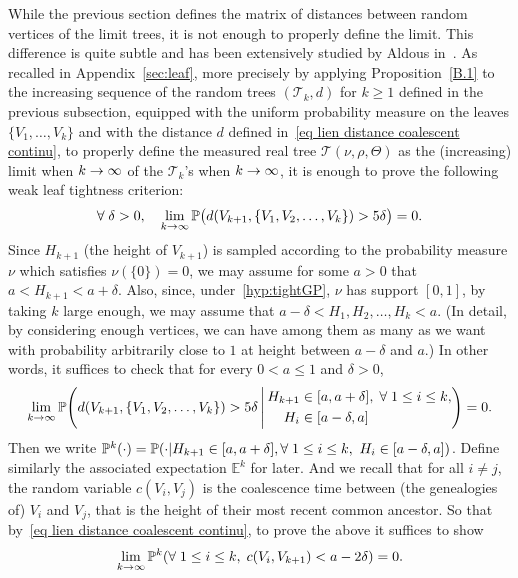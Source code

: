 \documentclass[10pt]{amsart}
\theoremstyle{definition}\newtheorem{defi}[theo]{Definition}\newtheorem{rema}[theo]{Remark}\newtheorem{exam}[theo]{Example}\newtheorem{exem}[theo]{Example}\newtheorem{nota}[theo]{Notation}
\newcommand{\probak}[1]{\mathbb{P}^k\left(#1\right)}
\renewcommand{\P}{{\mathbb{P}}}
\newcommand{\E}{\mathbb{E}}
\newcommand{\1}{\mathbbm{1}}
\newcommand{\T}{\mathcal{T}}
\let\originalleft\left
\let\originalright\right
\renewcommand{\left}{\mathopen{}\mathclose\bgroup\originalleft}
\renewcommand{\right}{\aftergroup\egroup\originalright}
\renewcommand*{\to}{\mathchoice{\longrightarrow}{\rightarrow}{\rightarrow}{\rightarrow}}
\let\oldforall\forall
\renewcommand*{\forall}{\mathrel{\oldforall}}
\begin{document}
While the previous section defines the matrix of distances between random vertices of the limit trees, it is not enough to properly define the limit. This difference is quite subtle and has been extensively studied by Aldous in~\cite{Ald93}. As recalled in Appendix~\ref{sec:leaf}, {more precisely by applying Proposition~\ref{B.1} to the increasing sequence of the random trees $(\T_k,d)$ for $k\ge 1$ defined in the previous subsection, equipped with the uniform probability measure on the leaves $\{V_1, \dots, V_k\}$ and with the distance $d$ defined in~\eqref{eq lien distance coalescent continu},} to properly define the {measured real tree $\T(\nu, \rho, \Theta)$ as the (increasing) limit when $k\to \infty$ of the $\T_k$'s when $k\to \infty$,} it is enough to prove the following weak leaf tightness criterion:
\[
\forall \delta>0, \quad \lim_{k\to \infty} \mathbb{P} \bigl(d(V_{k+1},\{V_1,V_2,\dots, V_k\})>{5}\delta\bigr)=0.
\]
Since $H_{k+1}$ (the height of $V_{k+1}$) is sampled according to the probability measure $\nu$ which satisfies $\nu(\{0\})=0$, we may assume for some $a>0$ that $a<H_{k+1}<a+\delta$. Also, since, under~\ref{hyp:tightGP}, $\nu$ has support $[0,1]${,} by taking $k$ large enough, we may assume that $a-\delta<H_1,H_2,\dots, H_k<a$. ({In} detail, by considering enough vertices, we can have among them as many as we want {with probability arbitrarily close to $1$} at height between $a-\delta$ and $a$.) In other words, it suffices to check that for every $0<a\leq 1$ and $\delta>0$,
\begin{align*}
\lim_{k\to \infty} \mathbb{P}\left(
d(V_{k+1},\{V_1,V_2,\dots, V_k\})>{5}\delta \,\middle|\,
\begin{aligned}
H_{k+1} &\in [a,a+\delta],\;\forall 1\leq i \leq k,\\ 
H_i &\in[a-\delta,a]
\end{aligned}
\right)
=0.
\end{align*}
Then we write $\probak{\cdot}=\P(\cdot|H_{k+1}\in [a,a+\delta], \forall 1\leq i \leq k, \, \, H_i\in[a-\delta,a])$. Define similarly the associated expectation $\E^k$ for later. And we recall that for all $i\neq j$, the random variable $c(V_i,V_j)$ is the coalescence time between (the genealogies of) $V_i$ and $V_j$, that is the height of their most recent common ancestor. So that by~\eqref{eq lien distance coalescent continu}, to prove the above it suffices to show
\begin{equation}\label{eq:desired_limit_leaf_tight}
\lim_{k\to \infty} \probak{\forall 1\leq i \leq k, \; c(V_i,V_{k+1})<a-2\delta}=0.
\end{equation}
\end{document}
